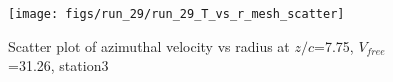 \begin{figure}[H]
\centering
\texttt{[image: figs/run\_29/run\_29\_T\_vs\_r\_mesh\_scatter]}
\caption{Scatter plot of azimuthal velocity vs radius at $z/c$=7.75, $V_{free}$=31.26, station3}
\label{fig:run_29_T_vs_r_mesh_scatter}
\end{figure}


